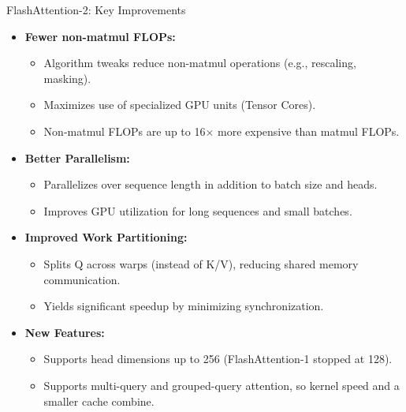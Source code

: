 \begin{frame}[allowframebreaks]{FlashAttention-2: Key Improvements}
    \begin{itemize}
        \item \textbf{Fewer non-matmul FLOPs:}
        \begin{itemize}
            \item Algorithm tweaks reduce non-matmul operations (e.g., rescaling, masking).
            \item Maximizes use of specialized GPU units (Tensor Cores).
            \item Non-matmul FLOPs are up to 16$\times$ more expensive than matmul FLOPs.
        \end{itemize}
        \item \textbf{Better Parallelism:}
        \begin{itemize}
            \item Parallelizes over sequence length in addition to batch size and heads.
            \item Improves GPU utilization for long sequences and small batches.
        \end{itemize}
    \framebreak
        \item \textbf{Improved Work Partitioning:}
        \begin{itemize}
            \item Splits Q across warps (instead of K/V), reducing shared memory communication.
            \item Yields significant speedup by minimizing synchronization.
        \end{itemize}
        \item \textbf{New Features:}
        \begin{itemize}
            \item Supports head dimensions up to 256 (FlashAttention-1 stopped at 128).
            \item Supports multi-query and grouped-query attention, so kernel speed and a smaller cache combine.
        \end{itemize}
    \end{itemize}
\end{frame}

